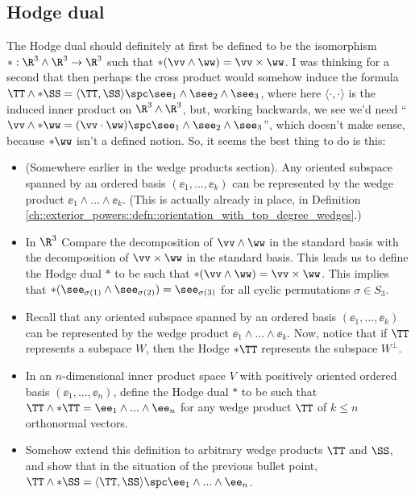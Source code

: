 \subsection*{Hodge dual}

The Hodge dual should definitely at first be defined to be the isomorphism $*:\R^3 \wedge \R^3 \rightarrow \R^3$ such that $*(\vv \wedge \ww) = \vv \times \ww$. I was thinking for a second that then perhaps the cross product would somehow induce the formula $\TT \wedge *\SS = \langle \TT, \SS \rangle \spc \see_1 \wedge \see_2 \wedge \see_3$, where here $\langle \cdot, \cdot \rangle$ is the induced inner product on $\R^3 \wedge \R^3$, but, working backwards, we see we'd need ``$\vv \wedge *\ww = (\vv \cdot \ww) \spc \see_1 \wedge \see_2 \wedge \see_3$'', which doesn't make sense, because $*\ww$ isn't a defined notion. So, it seems the best thing to do is this:

\begin{itemize}
	\item (Somewhere earlier in the wedge products section). Any oriented subspace spanned by an ordered basis $(\ee_1, ..., \ee_k)$ can be represented by the wedge product $\ee_1 \wedge ... \wedge \ee_k$. (This is actually already in place, in Definition \ref{ch::exterior_powers::defn::orientation_with_top_degree_wedges}.)
	\item In $\R^3$ Compare the decomposition of $\vv \wedge \ww$ in the standard basis with the decomposition of $\vv \times \ww$ in the standard basis. This leads us to define the Hodge dual $*$ to be such that $*(\vv \wedge \ww) = \vv \times \ww$. This implies that $*(\see_{\sigma(1)} \wedge \see_{\sigma(2)}) = \see_{\sigma(3)}$ for all cyclic permutations $\sigma \in S_3$.
	\item Recall that any oriented subspace spanned by an ordered basis $(\ee_1, ..., \ee_k)$ can be represented by the wedge product $\ee_1 \wedge ... \wedge \ee_k$. Now, notice that if $\TT$ represents a subspace $W$, then the Hodge $*\TT$ represents the subspace $W^\perp$.
	\item In an $n$-dimensional inner product space $V$ with positively oriented ordered basis $(\ee_1, ..., \ee_n)$, define the Hodge dual $*$ to be such that $\TT \wedge *\TT = \ee_1 \wedge ... \wedge \ee_n$ for any wedge product $\TT$ of $k \leq n$ orthonormal vectors.
	\item Somehow extend this definition to arbitrary wedge products $\TT$ and $\SS$, and show that in the situation of the previous bullet point, $\TT \wedge *\SS = \langle \TT, \SS \rangle \spc \ee_1 \wedge ... \wedge \ee_n$.
\end{itemize}

